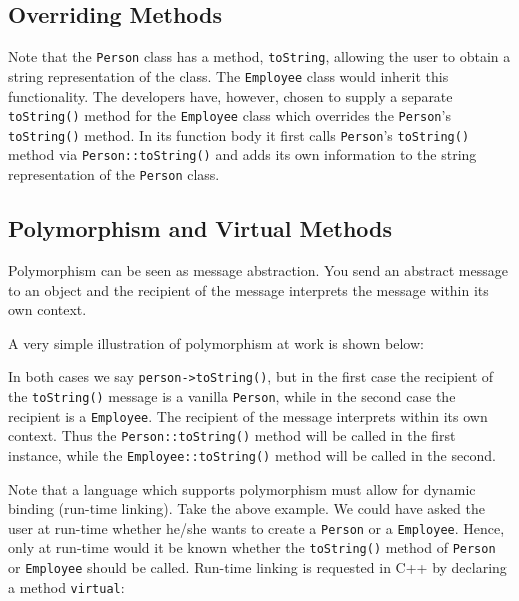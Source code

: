 \subsection{Overriding Methods}

Note that the \verb+Person+ class has a method, \verb+toString+, allowing
the user to obtain a string representation of the class. The \verb+Employee+
class would inherit this functionality. The developers have, however, chosen
to supply a separate \verb+toString()+ method for the \verb+Employee+ class
which overrides the \verb+Person+'s \verb+toString()+ method. In its function
body it first calls \verb+Person+'s \verb+toString()+ method via  
\verb+Person::toString()+ and adds its own information to the string
representation of the \verb+Person+ class.


\subsection{Polymorphism and Virtual Methods\label{secPolymorphism}}

Polymorphism can be seen as message abstraction. You send an abstract message
to an object and the recipient of the message interprets the message within
its own context. 

A very simple illustration of polymorphism at work is shown below:


In both cases we say \verb+person->toString()+, but in the first case the
recipient of the \verb+toString()+ message is a vanilla \verb+Person+, while 
in the second case the recipient is a \verb+Employee+. The recipient of the
message interprets within its own context.
Thus the \verb+Person::toString()+ method will be called in the first instance,
while the \verb+Employee::toString()+ method will be called in the second.

Note that a language which supports polymorphism must allow for dynamic binding
(run-time linking). Take the above example. We could have asked the user at
run-time whether he/she wants to create a \verb+Person+ or a \verb+Employee+.
Hence, only at run-time would it be known whether the \verb+toString()+ method
of \verb+Person+ or \verb+Employee+ should be called. Run-time linking is
requested in C++ by declaring a method \verb+virtual+:

